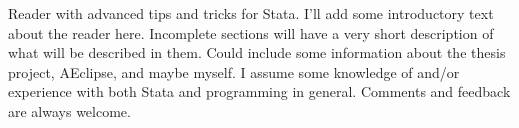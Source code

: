 Reader with advanced tips and tricks for Stata.
I'll add some introductory text about the reader here.
Incomplete sections will have a very short description of what will be described in them.
Could include some information about the thesis project, AEclipse, and maybe myself.
I assume some knowledge of and/or experience with both Stata and programming in general.
Comments and feedback are always welcome.
